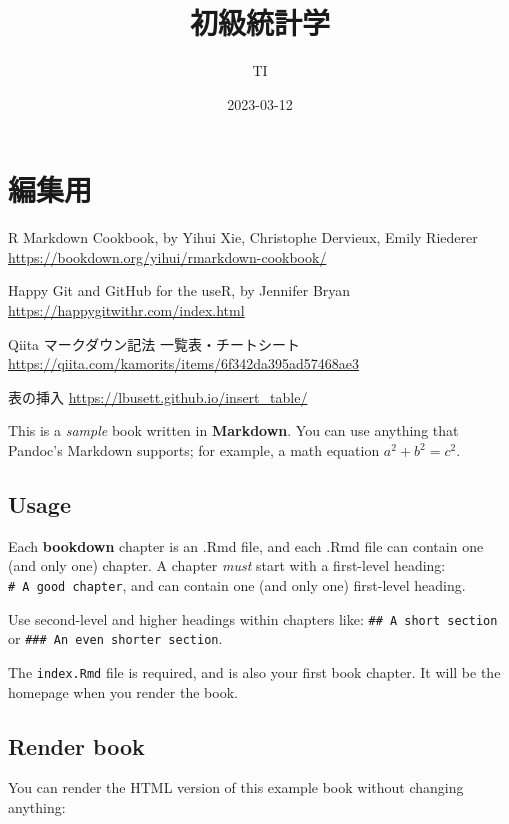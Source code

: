 \documentclass[
]{book}
\title{初級統計学}
\author{TI}
\date{2023-03-12}
\theoremstyle{definition}
\theoremstyle{definition}
\theoremstyle{definition}
\theoremstyle{definition}
\theoremstyle{remark}
\begin{document}
\maketitle

{
\setcounter{tocdepth}{1}
\tableofcontents
}
\hypertarget{ux7de8ux96c6ux7528}{%
\chapter*{編集用}\label{ux7de8ux96c6ux7528}}

R Markdown Cookbook, by Yihui Xie, Christophe Dervieux, Emily Riederer
\url{https://bookdown.org/yihui/rmarkdown-cookbook/}

Happy Git and GitHub for the useR, by Jennifer Bryan
\url{https://happygitwithr.com/index.html}

Qiita マークダウン記法 一覧表・チートシート
\url{https://qiita.com/kamorits/items/6f342da395ad57468ae3}

表の挿入
\url{https://lbusett.github.io/insert_table/}

This is a \emph{sample} book written in \textbf{Markdown}. You can use anything that Pandoc's Markdown supports; for example, a math equation \(a^2 + b^2 = c^2\).

\hypertarget{usage}{%
\section{Usage}\label{usage}}

Each \textbf{bookdown} chapter is an .Rmd file, and each .Rmd file can contain one (and only one) chapter. A chapter \emph{must} start with a first-level heading: \texttt{\#\ A\ good\ chapter}, and can contain one (and only one) first-level heading.

Use second-level and higher headings within chapters like: \texttt{\#\#\ A\ short\ section} or \texttt{\#\#\#\ An\ even\ shorter\ section}.

The \texttt{index.Rmd} file is required, and is also your first book chapter. It will be the homepage when you render the book.

\hypertarget{render-book}{%
\section{Render book}\label{render-book}}

You can render the HTML version of this example book without changing anything:
\end{document}
